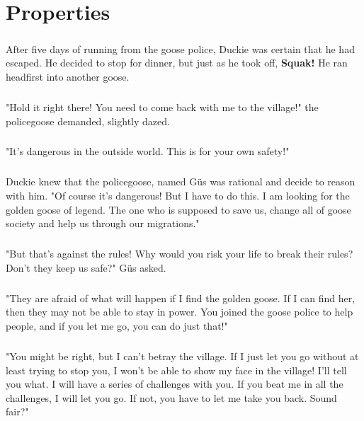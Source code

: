 \chapter{Properties}
\paragraph{} After five days of running from the goose police, Duckie was certain that he had escaped. He decided to stop for dinner, but just as he took off, \textbf{Squak!} He ran headfirst into another goose. 
\paragraph{} "Hold it right there! You need to come back with me to the village!" the policegoose demanded, slightly dazed. 
\paragraph{} "It's dangerous in the outside world. This is for your own safety!"
\paragraph{} Duckie knew that the policegoose, named Güs was rational and decide to reason with him. "Of course it's dangerous! But I have to do this. I am looking for the golden goose of legend. The one who is supposed to save us, change all of goose society and help us through our migrations."
\paragraph{} "But that's against the rules! Why would you risk your life to break their rules? Don't they keep us safe?" Güs asked.
\paragraph{} "They are afraid of what will happen if I find the golden goose. If I can find her, then they may not be able to stay in power. You joined the goose police to help people, and if you let me go, you can do just that!"
\paragraph{} "You might be right, but I can't betray the village. If I just let you go without at least trying to stop you, I won't be able to show my face in the village! I'll tell you what. I will have a series of challenges with you. If you beat me in all the challenges, I will let you go. If not, you have to let me take you back. Sound fair?"
